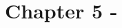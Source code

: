 \documentclass[
  a4paper,
  DIV=11,
  numbers=noendperiod,
  oneside]{scrreport}
\author{}
\date{}
\begin{document}
\chapter{Chapter 5 -}\label{chapter-5--}
\end{document}
